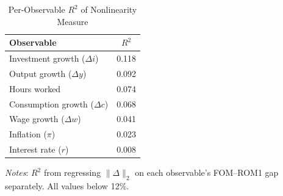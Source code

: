 \documentclass[12pt]{article}
\theoremstyle{plain}
\theoremstyle{definition}
\theoremstyle{remark}
\newcommand{\tablenotes}[1]{%
  \par\vspace{0.5em}%
  \noindent\begin{minipage}{\textwidth}%
  \raggedright\footnotesize #1%
  \end{minipage}\par%
}
\begin{document}
\begin{table}[htbp]
\centering
\caption{Per-Observable $R^2$ of Nonlinearity Measure}
\label{tab:per_obs_r2}
\begin{tabular}{lc}
\toprule
Observable & $R^2$ \\
\midrule
Investment growth ($\Delta i$) & 0.118 \\
Output growth ($\Delta y$) & 0.092 \\
Hours worked & 0.074 \\
Consumption growth ($\Delta c$) & 0.068 \\
Wage growth ($\Delta w$) & 0.041 \\
Inflation ($\pi$) & 0.023 \\
Interest rate ($r$) & 0.008 \\
\bottomrule
\end{tabular}
\smallskip
\tablenotes{\textit{Notes}: $R^2$ from regressing $\|\Delta\|_2$ on each observable's FOM--ROM1 gap separately. All values below 12\%.}
\end{table}
\end{document}
